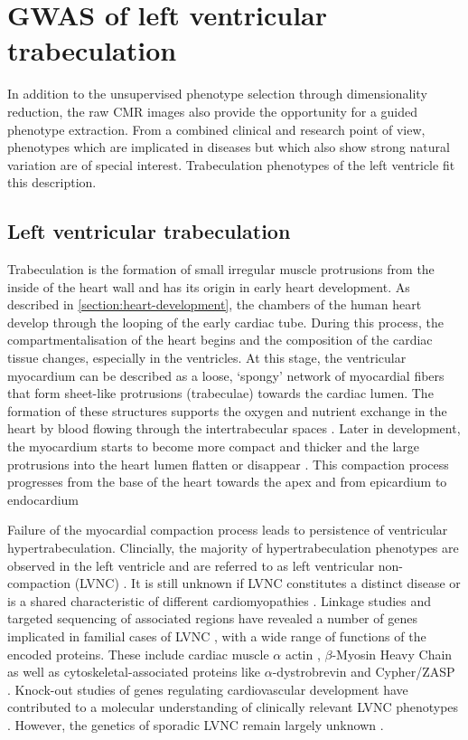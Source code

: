 \chapter{GWAS of left ventricular trabeculation}
\label{chapter:GWAS-FD}
In addition to the unsupervised phenotype selection through dimensionality reduction, the raw CMR images also provide the opportunity for a guided phenotype extraction. From a combined clinical and research point of view, phenotypes which are implicated in diseases but which also show strong natural variation are of special interest. Trabeculation phenotypes of the left ventricle fit this description.

\section{Left ventricular trabeculation}
\label{section:intro-FD}
Trabeculation is the formation of small irregular muscle protrusions from the inside of the heart wall and has its origin in early heart development. As described in \cref{section:heart-development}, the chambers of the human heart develop through the looping of the early cardiac tube. During this process, the compartmentalisation of the heart begins and the composition of the cardiac tissue changes, especially in the ventricles. At this stage, the ventricular myocardium can be described as a loose, `spongy' network of myocardial fibers that form sheet-like protrusions (trabeculae) towards the cardiac lumen. The formation of these structures supports the oxygen and nutrient exchange in the heart \citep{Chen2009} by blood flowing through the intertrabecular spaces \citep{Zambrano2002}. Later in development, the myocardium starts to become more compact and thicker and the large protrusions into the heart lumen flatten or disappear \citep{Yousef2009}. This compaction process progresses from the base of the heart towards the apex and from epicardium to endocardium \citep{Zambrano2002}

Failure of the myocardial compaction process leads to persistence of ventricular hypertrabeculation. Clincially, the majority of hypertrabeculation phenotypes are observed in the left ventricle and are referred to as left ventricular non-compaction (LVNC) \citep{Zambrano2002}. It is still unknown if LVNC constitutes a distinct disease or is a shared characteristic of different cardiomyopathies \citep{Captur2013}. Linkage studies and targeted sequencing of associated regions have revealed a number of genes implicated in familial cases of LVNC \citep{Bleyl1997,Klaassen2008,Moric-Janiszewska2008}, with a wide range of functions of the encoded proteins. These include cardiac muscle \(\alpha\) actin \citep{Monserrat2007}, 
\(\beta\)-Myosin Heavy Chain \citep{Budde2007} as well as cytoskeletal-associated proteins like \(\alpha\)-dystrobrevin \citep{Ichida2001} and Cypher/ZASP \citep{Vatta2003}. Knock-out studies of genes regulating cardiovascular development have contributed to a molecular understanding of clinically relevant LVNC phenotypes \citep{Chen2009,Mysliwiec2011}. However, the genetics of sporadic LVNC remain largely unknown \citep{Zambrano2002}.

